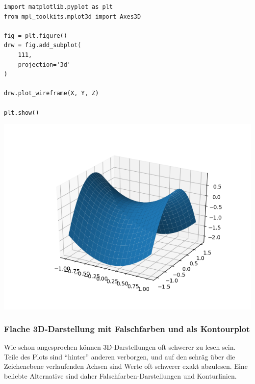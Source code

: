 \begin{codebox}[Beispiel: Ausgefülltes Drahtgittermodell, width=.55\linewidth, nobeforeafter, equal height group = grpXmpSurface3D]
\begin{verbatim}
import matplotlib.pyplot as plt
from mpl_toolkits.mplot3d import Axes3D

fig = plt.figure()
drw = fig.add_subplot(
    111,
    projection='3d'
)

drw.plot_wireframe(X, Y, Z)

plt.show()
\end{verbatim}
\end{codebox}
%
\begin{tcolorbox}[title=Ausgabe: Ausgef. Drahtgittermodell, width=.45\linewidth, nobeforeafter, equal height group = grpXmpSurface3D]
	\includegraphics[width=\linewidth]{./gfx/plt-surface3D}
\end{tcolorbox}

\subsubsection{Flache 3D-Darstellung mit Falschfarben und als Kontourplot}
Wie schon angesprochen können 3D-Darstellungen oft schwerer zu lesen sein. Teile des Plots sind \enquote{hinter} anderen verborgen, und auf den schräg über die Zeichenebene verlaufenden Achsen sind Werte oft schwerer exakt abzulesen. Eine beliebte Alternative sind daher Falschfarben-Darstellungen und Konturlinien.

